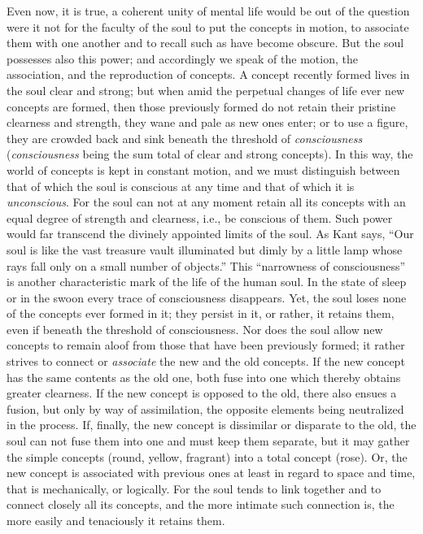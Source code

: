 Even now, it is true, a coherent unity of mental life would be out of the question were it not for the faculty of the soul to put the concepts in motion, to associate them with one another and to recall such as have become obscure. But the soul possesses also this power; and accordingly we speak of the motion, the association, and the reproduction of concepts. A concept recently formed lives in the soul clear and strong; but when amid the perpetual changes of life ever new concepts are formed, then those previously formed do not retain their pristine clearness and strength, they wane and pale as new ones enter; or to use a figure, they are crowded back and sink beneath the threshold of \emph{consciousness} (\emph{consciousness} being the sum total of clear and strong concepts). In this way, the world of concepts is kept in constant motion, and we must distinguish between that of which the soul is conscious at any time and that of which it is \emph{unconscious}. For the soul can not at any moment retain all its concepts with an equal degree of strength and clearness, i.e., be conscious of them. Such power would far transcend the divinely appointed limits of the soul. As Kant says, “Our soul is like the vast treasure vault illuminated
but dimly by a little lamp whose rays fall only on a small number of objects.” This “narrowness of consciousness” is another characteristic mark of the life of the human soul. In the state of sleep or in the swoon every trace of consciousness disappears. Yet, the soul loses none of the concepts ever formed in it; they persist in it, or rather, it retains them, even if beneath the threshold of consciousness. Nor does the soul allow new concepts to remain aloof from those that have been previously formed; it rather strives to connect or \emph{associate} the new and the old concepts. If the new concept has the same contents as the old one, both fuse into one which thereby obtains greater clearness. If the new concept is opposed to the old, there also ensues a fusion, but only by way of assimilation, the opposite elements being neutralized in the process. If, finally, the new concept is dissimilar or disparate to the old, the soul can not fuse them into one and must keep them separate, but it may gather the simple concepts (round, yellow, fragrant) into a total concept (rose). Or, the new concept is associated with previous ones at least in regard to space and time, that is mechanically, or logically. For the soul tends to link together and to connect closely all its concepts, and the more intimate such connection is, the more easily and tenaciously it retains them.

